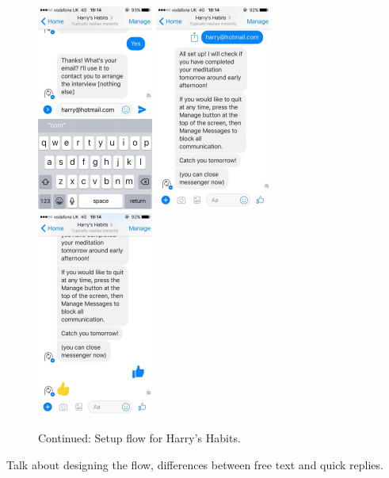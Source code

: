 \begin{figure}[H]
  \centering
  \includegraphics[width=1.5in]{resources/design/process/13.jpg}
  \hspace{10px}
  \includegraphics[width=1.5in]{resources/design/process/14.jpg}
  \hspace{10px}
  \includegraphics[width=1.5in]{resources/design/process/15.jpg}
  \caption{Continued: Setup flow for Harry's Habits.}
  \label{fig:setup_flow_screenshots_2}
\end{figure}

Talk about designing the flow, differences between free text and quick replies.

